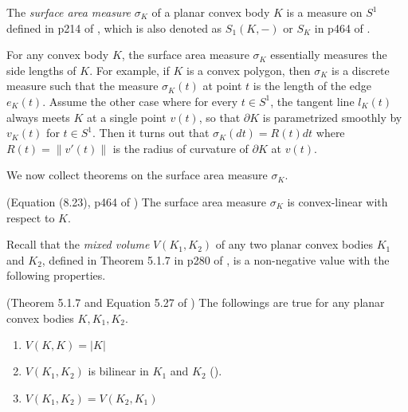 \begin{definition}

The \emph{surface area measure} \(\sigma_K\) of a planar convex body \(K\) is a measure on \(S^1\) defined in p214 of \cite{schneider_2013}, which is also denoted as \(S_1(K, -)\) or \(S_K\) in p464 of \cite{schneider_2013}.

\label{def:surface-area-measure}
\end{definition}

For any convex body \(K\), the surface area measure \(\sigma_K\) essentially measures the side lengths of \(K\). For example, if \(K\) is a convex polygon, then \(\sigma_K\) is a discrete measure such that the measure \(\sigma_K\left( t \right)\) at point \(t\) is the length of the edge \(e_K(t)\). Assume the other case where for every \(t \in S^1\), the tangent line \(l_K(t)\) always meets \(K\) at a single point \(v(t)\), so that \(\partial K\) is parametrized smoothly by \(v_K(t)\) for \(t \in S^1\). Then it turns out that \(\sigma_K(dt) = R(t) dt\) where \(R(t) = \left\lVert v'(t) \right\rVert\) is the radius of curvature of \(\partial K\) at \(v(t)\).

We now collect theorems on the surface area measure \(\sigma_K\).

\begin{theorem}

(Equation (8.23), p464 of \cite{schneider_2013}) The surface area measure \(\sigma_K\) is convex-linear with respect to \(K\).

\label{thm:surface-area-measure-convex-linear}
\end{theorem}

Recall that the \emph{mixed volume} \(V(K_1, K_2)\) of any two planar convex bodies \(K_1\) and \(K_2\), defined in Theorem 5.1.7 in p280 of \cite{schneider_2013}, is a non-negative value with the following properties.

\begin{theorem}

(Theorem 5.1.7 and Equation 5.27 of \cite{schneider_2013}) The followings are true for any planar convex bodies \(K, K_1, K_2\).

\begin{enumerate}
\def\labelenumi{\arabic{enumi}.}
\tightlist
\item
  \(V(K, K) = |K|\)
\item
  \(V(K_1, K_2)\) is bilinear in \(K_1\) and \(K_2\) ().
\item
  \(V(K_1, K_2) = V(K_2, K_1)\)
\end{enumerate}

\label{thm:mixed-volume}
\end{theorem}

